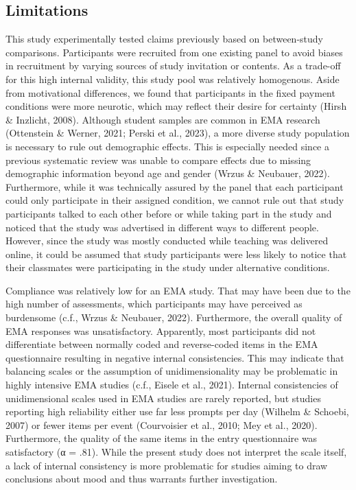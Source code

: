 \documentclass[authordate, empirical,issue]{jote-new-article}
\begin{document}
\subsection{Limitations}



This study experimentally tested claims previously based on between-study comparisons. Participants were recruited from one existing panel to avoid biases in recruitment by varying sources of study invitation or contents. As a trade-off for this high internal validity, this study pool was relatively homogenous. Aside from motivational differences, we found that participants in the fixed payment conditions were more neurotic, which may reflect their desire for certainty (Hirsh \& Inzlicht, 2008). Although student samples are common in EMA research (Ottenstein \& Werner, 2021; Perski et al., 2023), a more diverse study population is necessary to rule out demographic effects. This is especially needed since a previous systematic review was unable to compare effects due to missing demographic information beyond age and gender (Wrzus \& Neubauer, 2022). Furthermore, while it was technically assured by the panel that each participant could only participate in their assigned condition, we cannot rule out that study participants talked to each other before or while taking part in the study and noticed that the study was advertised in different ways to different people. However, since the study was mostly conducted while teaching was delivered online, it could be assumed that study participants were less likely to notice that their classmates were participating in the study under alternative conditions.



Compliance was relatively low for an EMA study. That may have been due to the high number of assessments, which participants may have perceived as burdensome (c.f., Wrzus \& Neubauer, 2022). Furthermore, the overall quality of EMA responses was unsatisfactory. Apparently, most participants did not differentiate between normally coded and reverse-coded items in the EMA questionnaire resulting in negative internal consistencies. This may indicate that balancing scales or the assumption of unidimensionality may be problematic in highly intensive EMA studies (c.f., Eisele et al., 2021). Internal consistencies of unidimensional scales used in EMA studies are rarely reported, but studies reporting high reliability either use far less prompts per day (Wilhelm \& Schoebi, 2007) or fewer items per event (Courvoisier et al., 2010; Mey et al., 2020). Furthermore, the quality of the same items in the entry questionnaire was satisfactory (α = .81). While the present study does not interpret the scale itself, a lack of internal consistency is more problematic for studies aiming to draw conclusions about mood and thus warrants further investigation.
\end{document}
